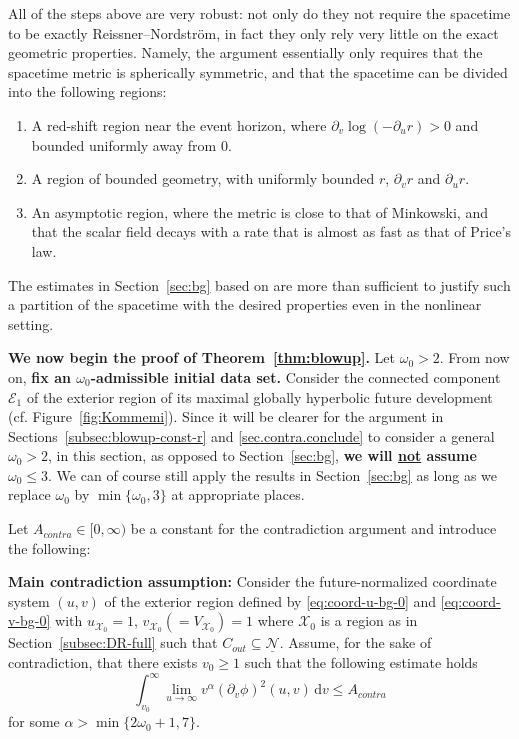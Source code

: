 \documentclass[10pt, reqno]{amsart}
\theoremstyle{definition}
\theoremstyle{remark}
\theoremstyle{conjecture}
\numberwithin{equation}{section}
\newcommand{\ud}{\mathrm{d}}
\newcommand{\rd}{\partial}
\newcommand{\0}{\emptyset}
\newcommand{\alp}{\alpha}
\newcommand{\omg}{\omega}
\newcommand{\calN}{\mathcal N}
\newcommand{\calX}{\mathcal X}
\newcommand{\Ext}{\mathscr{E}}
\begin{document}
All of the steps above are very robust: not only do they not require the spacetime to be exactly Reissner--Nordstr\"om, in fact they only rely very little on the exact geometric properties. Namely, the argument essentially only requires that the spacetime metric is spherically symmetric, and that the spacetime can be divided into the following regions:
\begin{enumerate}
\item A red-shift region near the event horizon, where $\rd_v\log (-\rd_{u} r)>0$ and bounded uniformly away from $0$.
\item A region of bounded geometry, with uniformly bounded $r$, $\rd_{v} r$ and $\rd_{u} r$.
\item An asymptotic region, where the metric is close to that of Minkowski, and that the scalar field decays with a rate that is almost as fast as that of Price's law.
\end{enumerate}
The estimates in Section~\ref{sec:bg} based on \cite{DRPL} are more than sufficient to justify such a partition of the spacetime with the desired properties even in the nonlinear setting.

\textbf{We now begin the proof of Theorem~\ref{thm:blowup}.} Let $\omg_0>2$. From now on, \textbf{fix an $\omg_0$-admissible initial data set.} Consider the connected component $\Ext_{1}$ of the exterior region of its maximal globally hyperbolic future development (cf. Figure~\ref{fig:Kommemi}).
Since it will be clearer for the argument in Sections~\ref{subsec:blowup-const-r} and \ref{sec.contra.conclude} to consider a general $\omg_0>2$, in this section, as opposed to Section~\ref{sec:bg}, \textbf{we will \underline{not} assume $\omg_0\leq 3$}. We can of course still apply the results in Section~\ref{sec:bg} as long as we replace $\omg_0$ by $\min\{\omg_0,3\}$ at appropriate places.

Let $A_{contra}\in [0,\infty)$ be a constant for the contradiction argument and introduce the following:

\textbf{Main contradiction assumption:} Consider the future-normalized coordinate system $(u,v)$ of the exterior region defined by \eqref{eq:coord-u-bg-0} and \eqref{eq:coord-v-bg-0} with $u_{\calX_0}=1$, $v_{\calX_0}(=V_{\calX_0})=1$ where $\calX_0$ is a region as in Section~\ref{subsec:DR-full} such that $C_{out}\subseteq \underline{\calN}$. Assume, for the sake of contradiction, that there exists $v_0\geq 1$ such that the following estimate holds
\begin{equation}\label{main.contradiction}
\int_{v_0}^\infty \lim_{u\to \infty} v^{\alp}(\rd_v\phi)^2(u,v)\, \ud v \leq A_{contra}
\end{equation}
for some $\alp>\min\{2\omg_0+1, 7\}$.
\end{document}

